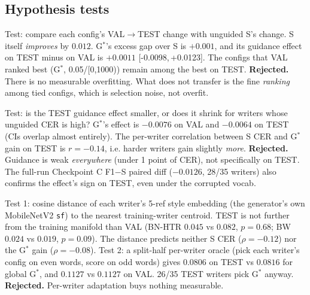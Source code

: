 \documentclass[10.5pt,a4paper]{article}
\newcommand{\ci}[2]{{\footnotesize[#1,\,#2]}}
\begin{document}
\subsection{Hypothesis tests}
\begin{description}[style=unboxed,leftmargin=0pt,nosep]
\item[H1 (overfit: tuned configs degrade more on TEST).] Test: compare each config's VAL$\to$TEST change with
unguided S's change. S itself \emph{improves} by $0.012$. G$^*$'s excess gap over S is $+0.001$, and its guidance
effect on TEST minus on VAL is $+0.0011$ \ci{-0.0098}{+0.0123}. The configs that VAL ranked best (G$^*$,
0.05/[0,1000)) remain among the best on TEST. \textbf{Rejected.} There is no measurable overfitting. What does not
transfer is the fine \emph{ranking} among tied configs, which is selection noise, not overfit.
\item[H2 (guidance inherently weak on TEST writers).] Test: is the TEST guidance effect smaller, or does it shrink for
writers whose unguided CER is high? G$^*$'s effect is $-0.0076$ on VAL and $-0.0064$ on TEST (CIs overlap almost
entirely). The per-writer correlation between S CER and G$^*$ gain on TEST is $r=-0.14$, i.e. harder writers gain
slightly \emph{more}. \textbf{Rejected.} Guidance is weak \emph{everywhere} (under 1 point of CER), not specifically
on TEST. The full-run Checkpoint C F1$-$S paired diff ($-0.0126$, 28/35 writers) also confirms the effect's sign on
TEST, even under the corrupted vocab.
\item[H3 (VAL/TEST style mismatch; per-writer adaptation needed).] Test 1: cosine distance of each writer's 5-ref
style embedding (the generator's own MobileNetV2 \texttt{sf}) to the nearest training-writer centroid. TEST is not
further from the training manifold than VAL (BN-HTR $0.045$ vs $0.082$, $p=0.68$; BW $0.024$ vs $0.019$, $p=0.09$).
The distance predicts neither S CER ($\rho=-0.12$) nor the G$^*$ gain ($\rho=-0.08$). Test 2: a split-half per-writer
oracle (pick each writer's config on even words, score on odd words) gives $0.0806$ on TEST vs $0.0816$ for global
G$^*$, and $0.1127$ vs $0.1127$ on VAL. 26/35 TEST writers pick G$^*$ anyway. \textbf{Rejected.} Per-writer adaptation
buys nothing measurable.
\end{description}
\end{document}
